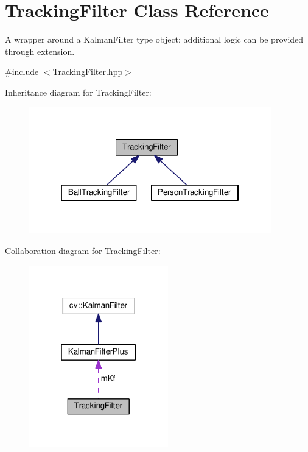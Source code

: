 \hypertarget{classTrackingFilter}{}\section{Tracking\+Filter Class Reference}
\label{classTrackingFilter}


A wrapper around a Kalman\+Filter type object; additional logic can be provided through extension.  




{\ttfamily \#include $<$Tracking\+Filter.\+hpp$>$}



Inheritance diagram for Tracking\+Filter\+:\nopagebreak
\begin{figure}[H]
\begin{center}
\leavevmode
\includegraphics[width=298pt]{classTrackingFilter__inherit__graph}
\end{center}
\end{figure}


Collaboration diagram for Tracking\+Filter\+:\nopagebreak
\begin{figure}[H]
\begin{center}
\leavevmode
\includegraphics[width=171pt]{classTrackingFilter__coll__graph}
\end{center}
\end{figure}
